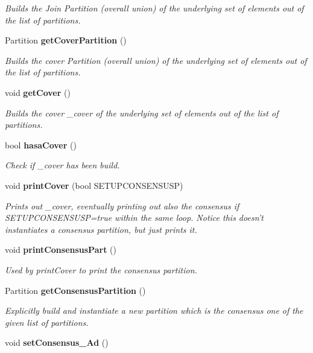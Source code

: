 \begin{CompactItemize}
\begin{CompactList}\small\item\em Builds the Join Partition (overall union) of the underlying set of elements out of the list of partitions. \item\end{CompactList}\item 
Partition {\bf get\-Cover\-Partition} ()\label{classPartitionStats_a10}

\begin{CompactList}\small\item\em Builds the cover Partition (overall union) of the underlying set of elements out of the list of partitions. \item\end{CompactList}\item 
void {\bf get\-Cover} ()\label{classPartitionStats_a11}

\begin{CompactList}\small\item\em Builds the cover \_\-cover of the underlying set of elements out of the list of partitions. \item\end{CompactList}\item 
bool {\bf hasa\-Cover} ()\label{classPartitionStats_a12}

\begin{CompactList}\small\item\em Check if \_\-cover has been build. \item\end{CompactList}\item 
void {\bf print\-Cover} (bool SETUPCONSENSUSP)
\begin{CompactList}\small\item\em Prints out \_\-cover, eventually printing out also the consensus if SETUPCONSENSUSP=true within the same loop. Notice this doesn't instantiates a consensus partition, but just prints it. \item\end{CompactList}\item 
void {\bf print\-Consensus\-Part} ()\label{classPartitionStats_a14}

\begin{CompactList}\small\item\em Used by print\-Cover to print the consensus partition. \item\end{CompactList}\item 
Partition {\bf get\-Consensus\-Partition} ()
\begin{CompactList}\small\item\em Explicitly build and instantiate a new partition which is the consensus one of the given list of partitions. \item\end{CompactList}\item 
void {\bf set\-Consensus\_\-Ad} ()\label{classPartitionStats_a16}


\end{CompactItemize}
